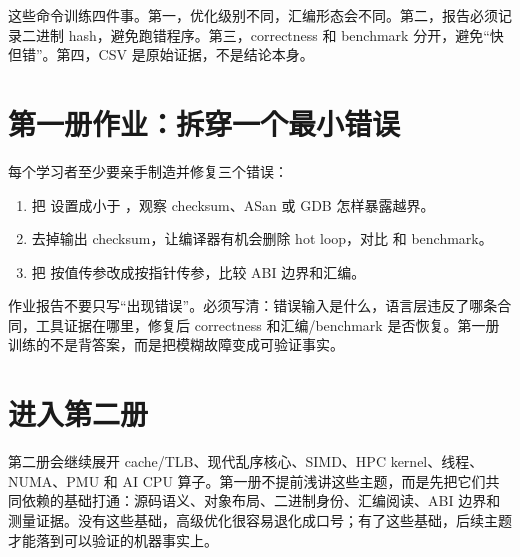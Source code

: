 这些命令训练四件事。第一，优化级别不同，汇编形态会不同。第二，报告必须记录二进制 hash，避免跑错程序。第三，correctness 和 benchmark 分开，避免“快但错”。第四，CSV 是原始证据，不是结论本身。

\section*{第一册作业：拆穿一个最小错误}

每个学习者至少要亲手制造并修复三个错误：

\begin{enumerate}
  \item 把  设置成小于 ，观察 checksum、ASan 或 GDB 怎样暴露越界。
  \item 去掉输出 checksum，让编译器有机会删除 hot loop，对比  和 benchmark。
  \item 把  按值传参改成按指针传参，比较 ABI 边界和汇编。
\end{enumerate}

作业报告不要只写“出现错误”。必须写清：错误输入是什么，语言层违反了哪条合同，工具证据在哪里，修复后 correctness 和汇编/benchmark 是否恢复。第一册训练的不是背答案，而是把模糊故障变成可验证事实。

\section*{进入第二册}

第二册会继续展开 cache/TLB、现代乱序核心、SIMD、HPC kernel、线程、NUMA、PMU 和 AI CPU 算子。第一册不提前浅讲这些主题，而是先把它们共同依赖的基础打通：源码语义、对象布局、二进制身份、汇编阅读、ABI 边界和测量证据。没有这些基础，高级优化很容易退化成口号；有了这些基础，后续主题才能落到可以验证的机器事实上。
